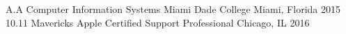 

\begin{cventries}

  \cventry
    {A.A Computer Information Systems} %
    {Miami Dade College} %
    {Miami, Florida} %
    {2015} %
    {}
  \cventry
  {10.11 Mavericks} %
  {Apple Certified Support Professional} %
  {Chicago, IL} %
  {2016} %
  {}

\end{cventries}
